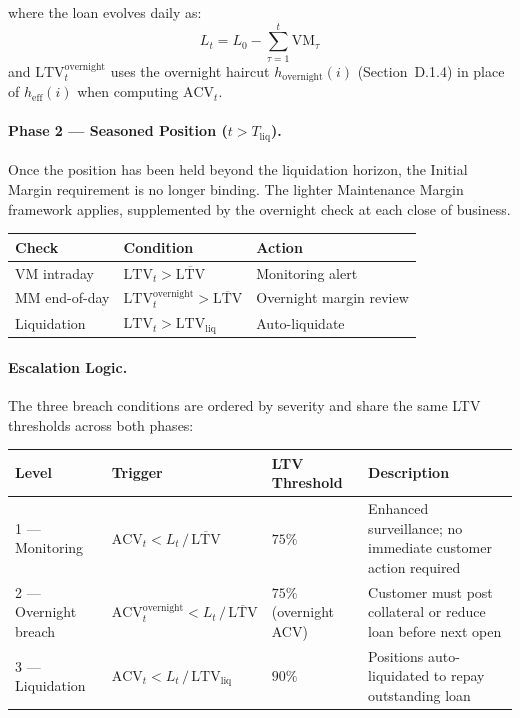 \documentclass[9pt, a4paper]{extarticle}
\begin{document}
where the loan evolves daily as:
\[
    L_t = L_0 - \sum_{\tau=1}^{t} \mathrm{VM}_\tau
\]
and $\mathrm{LTV}_t^{\text{overnight}}$ uses the overnight haircut $h_{\text{overnight}}(i)$
(Section~D.1.4) in place of $h_{\text{eff}}(i)$ when computing $\mathrm{ACV}_t$.

\paragraph{Phase 2 — Seasoned Position ($t > T_{\text{liq}}$).}
Once the position has been held beyond the liquidation horizon, the Initial Margin
requirement is no longer binding. The lighter Maintenance Margin framework applies,
supplemented by the overnight check at each close of business.

\begin{center}
\begin{tabularx}{0.96\linewidth}{lXl}
\toprule
\textbf{Check} & \textbf{Condition} & \textbf{Action} \\
\midrule
VM intraday
    & $\mathrm{LTV}_t > \overline{\mathrm{LTV}}$
    & Monitoring alert \\
MM end-of-day
    & $\mathrm{LTV}_t^{\text{overnight}} > \overline{\mathrm{LTV}}$
    & Overnight margin review \\
Liquidation
    & $\mathrm{LTV}_t > \mathrm{LTV}_{\text{liq}}$
    & Auto-liquidate \\
\bottomrule
\end{tabularx}
\end{center}

\paragraph{Escalation Logic.}
The three breach conditions are ordered by severity and share the same LTV
thresholds across both phases:

\begin{center}
\begin{tabularx}{0.96\linewidth}{lllX}
\toprule
\textbf{Level} & \textbf{Trigger} & \textbf{LTV Threshold} & \textbf{Description} \\
\midrule
1 — Monitoring
    & $\mathrm{ACV}_t < L_t\,/\,\overline{\mathrm{LTV}}$
    & $75\%$
    & Enhanced surveillance; no immediate customer action required \\
2 — Overnight breach
    & $\mathrm{ACV}_t^{\text{overnight}} < L_t\,/\,\overline{\mathrm{LTV}}$
    & $75\%$ (overnight ACV)
    & Customer must post collateral or reduce loan before next open \\
3 — Liquidation
    & $\mathrm{ACV}_t < L_t\,/\,\mathrm{LTV}_{\text{liq}}$
    & $90\%$
    & Positions auto-liquidated to repay outstanding loan \\
\bottomrule
\end{tabularx}
\end{center}
\end{document}
